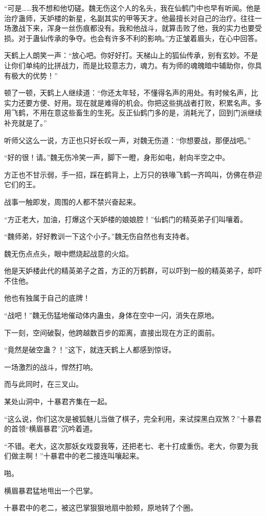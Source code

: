 \begin{this_body}
“可是……我不想和他切磋。魏无伤这个人的名头，我在仙鹤门中也早有听闻。他是治疗蛊师，天妒楼的新星，名副其实的甲等天才。他最擅长对自己的治疗。往往一场激战下来，浑身一丝伤痕都没有。我和他战斗，就算击败了他，我的实力也要受损。对于蛊仙传承的争夺。也会有许多不利的影响。”方正皱着眉头，在心中回答。

天鹤上人朗笑一声：“放心吧。你好好打。天梯山上的狐仙传承，别有玄妙。不是让你们单纯的比拼战力，而是比较意志力，魂力。有为师的魂魄暗中辅助你，你具有极大的优势！”

顿了一顿，天鹤上人继续道：“你还太年轻，不懂得名声的用处。有时候名声，比实力还要方便、好用。现在就是难得的机会。你把这些挑战者打败，积累名声。多用飞鹤，不用在意这些畜生的生死。反正仙鹤门多的是，消耗光了，回到门派继续补充就是了。”

听师父这么一说，方正也只好长叹一声，对魏无伤道：“你想要战，那便战吧。”

“好的很！请。”魏无伤冷笑一声，脚下一瞪，身形如电，射向半空之中。

方正也不甘示弱，手一招，踩在鹤背上，上万只的铁喙飞鹤一齐鸣叫，仿佛在恭迎它们的王。

战事一触即发，周围的人都不禁兴奋起来。

“方正老大，加油，打爆这个天妒楼的娘娘腔！”仙鹤门的精英弟子们叫嚷着。

“魏师弟，好好教训一下这个小子。”魏无伤自然也有支持者。

魏无伤点点头，眼中燃烧起战意的火焰。

他是天妒楼此代的精英弟子之首，方正的万鹤群，可以吓到一般的精英弟子，却吓不住他。

他也有独属于自己的底牌！

“战吧！”魏无伤猛地催动体内蛊虫，身体在空中一闪，消失在原地。

下一刻，空间破裂，他跨越数百步的距离，直接出现在方正的面前。

“竟然是破空蛊？！”这下，就连天鹤上人都感到惊讶。

一场激烈的战斗，悍然打响。

而与此同时，在三叉山。

某处山洞中，十暴君齐集在一起。

“这么说，你们这次是被狐魅儿当做了棋子，完全利用，来试探黑白双煞？”十暴君的首领“横眉暴君”沉吟着道。

“不错。老大，这次那妖女戏耍我等，还把老七、老十打成重伤。老大，你要为我们做主啊！”十暴君中的老二接连叫嚷起来。

啪。

横眉暴君猛地甩出一个巴掌。

十暴君中的老二，被这巴掌狠狠地扇中脸颊，原地转了个圈。


\end{this_body}
